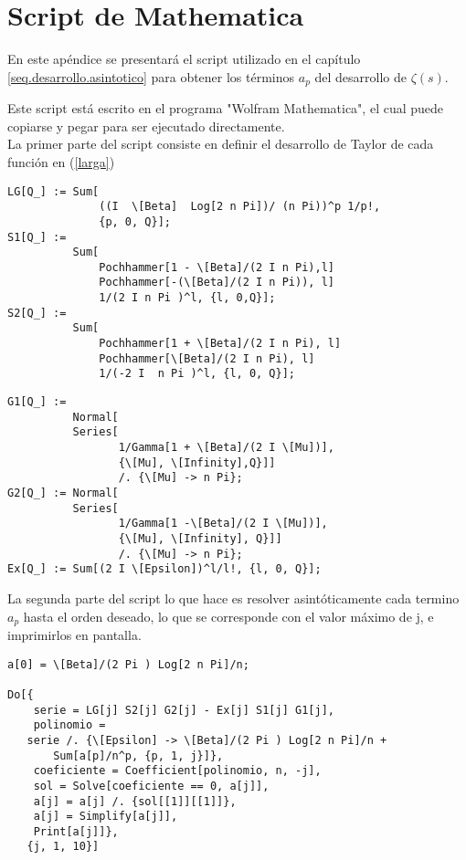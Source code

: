 \chapter{Script de Mathematica}\label{Apendice.1}

En este apéndice se presentará el script utilizado en el capítulo \ref{seq.desarrollo.asintotico} para obtener los términos $a _p$ del desarrollo de $\zeta (s)$. 

Este script está escrito en el programa "Wolfram Mathematica", el cual puede copiarse y pegar para ser ejecutado directamente.\\



La primer parte del script consiste en definir el desarrollo de Taylor de cada función  en (\ref{larga})
\begin{verbatim}
LG[Q_] := Sum[
              ((I  \[Beta]  Log[2 n Pi])/ (n Pi))^p 1/p!, 
              {p, 0, Q}];
S1[Q_] := 
          Sum[
              Pochhammer[1 - \[Beta]/(2 I n Pi),l] 
              Pochhammer[-(\[Beta]/(2 I n Pi)), l] 
              1/(2 I n Pi )^l, {l, 0,Q}];
S2[Q_] := 
          Sum[
              Pochhammer[1 + \[Beta]/(2 I n Pi), l] 
              Pochhammer[\[Beta]/(2 I n Pi), l] 
              1/(-2 I  n Pi )^l, {l, 0, Q}];
\end{verbatim}
\newpage
\begin{verbatim}
G1[Q_] := 
          Normal[
          Series[
                 1/Gamma[1 + \[Beta]/(2 I \[Mu])], 
                 {\[Mu], \[Infinity],Q}]] 
                 /. {\[Mu] -> n Pi};
G2[Q_] := Normal[
          Series[
                 1/Gamma[1 -\[Beta]/(2 I \[Mu])], 
                 {\[Mu], \[Infinity], Q}]] 
                 /. {\[Mu] -> n Pi};
Ex[Q_] := Sum[(2 I \[Epsilon])^l/l!, {l, 0, Q}];
\end{verbatim}
La segunda parte del script lo que hace es resolver asintóticamente cada termino $a_p$ hasta el orden deseado, lo que se corresponde con el valor máximo de j, e imprimirlos en pantalla.
\begin{verbatim}
a[0] = \[Beta]/(2 Pi ) Log[2 n Pi]/n;

Do[{
  	serie = LG[j] S2[j] G2[j] - Ex[j] S1[j] G1[j],
  	polinomio = 
   serie /. {\[Epsilon] -> \[Beta]/(2 Pi ) Log[2 n Pi]/n + 
       Sum[a[p]/n^p, {p, 1, j}]},
  	coeficiente = Coefficient[polinomio, n, -j],
  	sol = Solve[coeficiente == 0, a[j]],
  	a[j] = a[j] /. {sol[[1]][[1]]},
  	a[j] = Simplify[a[j]],
  	Print[a[j]]},
   {j, 1, 10}]
\end{verbatim}